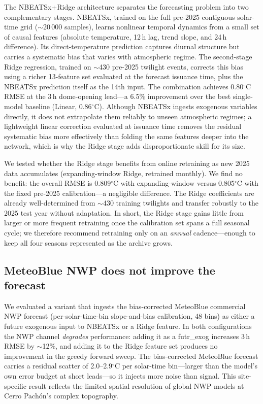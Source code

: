 \documentclass[]{spie}  %
\newcommand{\degC}{$^{\circ}$C}
\begin{document}
The NBEATSx+Ridge architecture separates the forecasting problem into two complementary stages. NBEATSx, trained on the full pre-2025 contiguous solar-time grid ($\sim$20\,000 samples), learns nonlinear temporal dynamics from a small set of causal features (absolute temperature, 12\,h lag, trend slope, and 24\,h difference). Its direct-temperature prediction captures diurnal structure but carries a systematic bias that varies with atmospheric regime. The second-stage Ridge regression, trained on $\sim$430 pre-2025 twilight events, corrects this bias using a richer 13-feature set evaluated at the forecast issuance time, plus the NBEATSx prediction itself as the 14th input. The combination achieves 0.80\degC{} RMSE at the 3\,h dome-opening lead---a 6.5\% improvement over the best single-model baseline (Linear, 0.86\degC{}). Although NBEATSx ingests exogenous variables directly, it does not extrapolate them reliably to unseen atmospheric regimes; a lightweight linear correction evaluated at issuance time removes the residual systematic bias more effectively than folding the same features deeper into the network, which is why the Ridge stage adds disproportionate skill for its size.

We tested whether the Ridge stage benefits from online retraining as new 2025 data accumulates (expanding-window Ridge, retrained monthly). We find no benefit: the overall RMSE is 0.809\degC{} with expanding-window versus 0.805\degC{} with the fixed pre-2025 calibration---a negligible difference. The Ridge coefficients are already well-determined from $\sim$430 training twilights and transfer robustly to the 2025 test year without adaptation. In short, the Ridge stage gains little from larger or more frequent retraining once the calibration set spans a full seasonal cycle; we therefore recommend retraining only on an \emph{annual} cadence---enough to keep all four seasons represented as the archive grows.

\subsection{MeteoBlue NWP does not improve the forecast}

We evaluated a variant that ingests the bias-corrected MeteoBlue commercial NWP forecast (per-solar-time-bin slope-and-bias calibration, 48 bins) as either a future exogenous input to NBEATSx or a Ridge feature. In both configurations the NWP channel \emph{degrades} performance: adding it as a futr\_exog increases 3\,h RMSE by $\sim$12\%, and adding it to the Ridge feature set produces no improvement in the greedy forward sweep. The bias-corrected MeteoBlue forecast carries a residual scatter of 2.0--2.9\degC{} per solar-time bin---larger than the model's own error budget at short leads---so it injects more noise than signal. This site-specific result reflects the limited spatial resolution of global NWP models at Cerro Pach\'on's complex topography.
\end{document}
